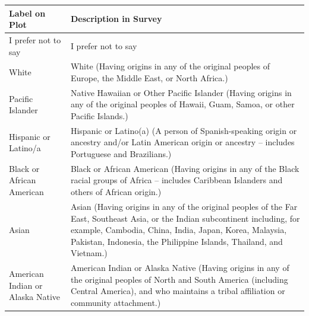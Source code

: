 \documentclass[
]{article}
\begin{document}
\begin{table}
\centering
\begin{tabular}{l>{\raggedright\arraybackslash}p{7cm}}
\toprule
Label on Plot & Description in Survey\\
\midrule
I prefer not to say & I prefer not to say\\
White & White (Having origins in any of the original peoples of Europe, the Middle East, or North Africa.)\\
Pacific Islander & Native Hawaiian or Other Pacific Islander (Having origins in any of the original peoples of Hawaii, Guam, Samoa, or other Pacific Islands.)\\
Hispanic or Latino/a & Hispanic or Latino(a) (A person of Spanish-speaking origin or ancestry and/or Latin American origin or ancestry – includes Portuguese and Brazilians.)\\
Black or African American & Black or African American (Having origins in any of the Black racial groups of Africa – includes Caribbean Islanders and others of African origin.)\\
\addlinespace
Asian & Asian (Having origins in any of the original peoples of the Far East, Southeast Asia, or the Indian subcontinent including, for example, Cambodia, China, India, Japan, Korea, Malaysia, Pakistan, Indonesia, the Philippine Islands, Thailand, and Vietnam.)\\
American Indian or Alaska Native & American Indian or Alaska Native (Having origins in any of the original peoples of North and South America (including Central America), and who maintains a tribal affiliation or community attachment.)\\
\bottomrule
\end{tabular}
\end{table}
\end{document}
